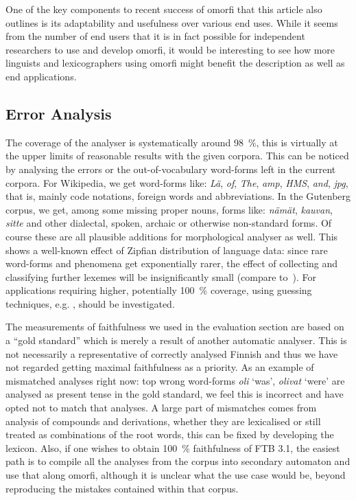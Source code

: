 \documentclass[a4paper,12pt]{article}
\begin{document}
One of the key components to recent success of omorfi that this article also
outlines is its adaptability and usefulness over various end uses.  While it
seems from the number of end users that it is in fact possible for
independent researchers to use and develop omorfi, it would be interesting
to see how more linguists and lexicographers using omorfi might benefit the
description as well as end applications.

\subsection{Error Analysis}

The coverage of the analyser is systematically around 98~\%, this is
virtually at the upper limits of reasonable results with the given corpora.
This can be noticed by analysing the errors or the out-of-vocabulary
word-forms left in the current corpora. For Wikipedia, we get word-forms
like: \textit{Lä}, \textit{of}, \textit{The}, \textit{amp}, \textit{HMS},
\textit{and}, \textit{jpg}, that is, mainly code notations, foreign words
and abbreviations. In the Gutenberg corpus, we get, among some missing
proper nouns, forms like: \textit{nämät}, \textit{kauvan}, \textit{sitte}
and other dialectal, spoken, archaic or otherwise non-standard forms. Of
course these are all plausible additions for morphological analyser as well.
This shows a well-known effect of Zipfian distribution of language data:
since rare word-forms and phenomena get exponentially rarer, the effect of
collecting and classifying further lexemes will be insignificantly small
(compare to~\cite{manning2011part}). For applications requiring higher, potentially
100~\% coverage, using guessing techniques, e.g. \citet{}, should be
investigated.

The measurements of faithfulness we used in the evaluation section are based on
a ``gold standard'' which is merely a result of another automatic analyser.
This is not necessarily a representative of correctly analysed Finnish and thus
we have not regarded getting maximal faithfulness as a priority. As an example
of mismatched analyses right now: top wrong word-forms \textit{oli} `was',
\textit{olivat} `were' are analysed as present tense in the gold standard, we
feel this is incorrect and have opted not to match that analyses. A large part
of mismatches comes from analysis of compounds and derivations, whether they
are lexicalised or still treated as combinations of the root words, this can be
fixed by developing the lexicon.  Also, if one wishes to obtain 100~\%
faithfulness of FTB 3.1, the easiest path is to compile all the analyses from
the corpus into secondary automaton and use that along omorfi, although it is
unclear what the use case would be, beyond reproducing the mistakes contained
within that corpus.
\end{document}
